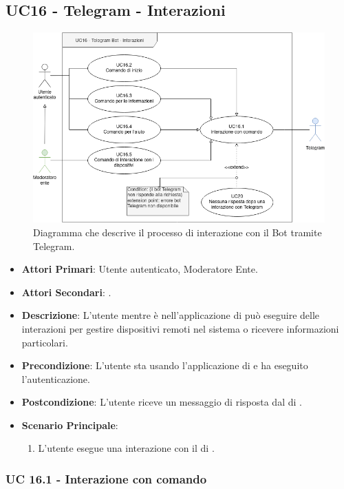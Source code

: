 \subsection{UC16 - Telegram - Interazioni}
		
	\begin{figure}[H]
		\centering
		\includegraphics[scale=0.60]{res/images/uc16}
		\caption{Diagramma che descrive il processo di interazione con il Bot tramite Telegram.}
	\end{figure}
		
	\begin{itemize}
		\item \textbf{Attori Primari}: Utente autenticato, Moderatore Ente.
		\item \textbf{Attori Secondari}: .
		\item \textbf{Descrizione}: L'utente mentre è nell'applicazione di  può eseguire delle interazioni per gestire dispositivi remoti nel sistema o ricevere informazioni particolari. 
		\item \textbf{Precondizione}: L'utente sta usando l'applicazione di  e ha eseguito l'autenticazione.
		\item \textbf{Postcondizione}: L'utente riceve un messaggio di risposta dal  di .
		\item \textbf{Scenario Principale}:
		\begin{enumerate}
			\item L'utente esegue una interazione con il  di .
		\end{enumerate}
	\end{itemize}
	
	\subsubsection{UC 16.1 - Interazione con comando}


